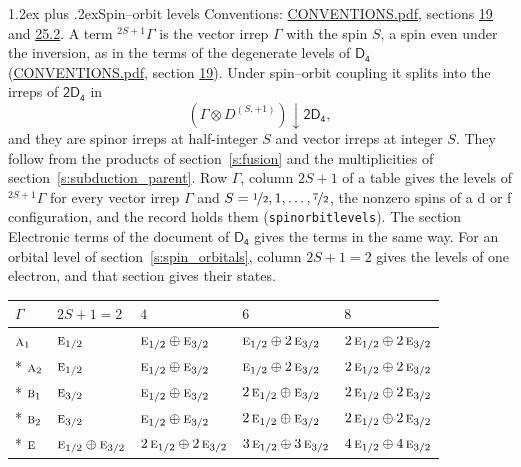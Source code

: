 \documentclass[10pt,a4paper]{article}
\makeatletter
\renewcommand\section{\@startsection{section}{1}{\z@}{-3ex plus -1ex minus -.2ex}%
  {1.2ex plus .2ex}{\normalfont\large\sffamily\bfseries\color{parttitle}}}
\numberwithin{equation}{section}
\newcommand{\grp}[1]{\mathsf{#1}}
\newcommand{\irr}[1]{\text{\normalfont\scshape #1}}
\newcommand{\restr}[2]{#1\!\downarrow#2}
\newcommand{\irrJp}[2]{D^{(#1,#2)}}
\newcommand{\irrprod}{\otimes}
\newcommand{\term}[2]{{}^{#1}#2}
\makeatother
\begin{document}
\section{Spin--orbit levels}\label{s:spin_orbit}
Conventions: \href{../../CONVENTIONS.pdf}{CONVENTIONS.pdf}, sections \href{../../../rotation/CONVENTIONS.pdf\#conv.19}{19} and \href{../../CONVENTIONS.pdf\#conv.25.2}{25.2}.
\leavevmode\label{n:local.spin}\label{n:symbol.term}A term $\term{2S+1}{\Gamma}$ is the vector irrep $\Gamma$ with the spin $S$, a spin even under the inversion, as in the terms of the degenerate levels of \href{../../../rotation/data/pdf/D4.pdf}{$\grp{D_{4}}$} (\href{../../CONVENTIONS.pdf}{CONVENTIONS.pdf}, section \href{../../../rotation/CONVENTIONS.pdf\#conv.19}{19}). Under spin--orbit coupling it splits into the irreps of $\grp{2D_{4}}$ in
\begin{equation}\label{e:spinorbit}\restr{(\Gamma \irrprod \irrJp{S}{+1})}{\grp{2D_{4}}},\end{equation}
and they are spinor irreps at half-integer $S$ and vector irreps at integer $S$. They follow from the products of section~\ref{s:fusion} and the multiplicities of section~\ref{s:subduction_parent}. Row $\Gamma$, column $2S + 1$ of a table gives the levels of $\term{2S+1}{\Gamma}$ for every vector irrep $\Gamma$ and $S = \nicefrac{1}{2}, 1, \dots, \nicefrac{7}{2}$, the nonzero spins of a d or f configuration, and the record holds them (\texttt{spinorbitlevels}). The section Electronic terms of the document of \href{../../../rotation/data/pdf/D4.pdf}{$\grp{D_{4}}$} gives the terms in the same way. For an orbital level of section~\ref{s:spin_orbitals}, column $2S + 1 = 2$ gives the levels of one electron, and that section gives their states.
{\small\setlength{\tabcolsep}{3pt}\begin{longtable}{@{}lllll@{}}\toprule
$\Gamma$ & $2S + 1 = 2$ & $4$ & $6$ & $8$\\\midrule\endhead
\bottomrule\endfoot\endlastfoot
$\irr{a}_{1}$ & $\irr{e}_{1/2}$ & $\irr{e}_{1/2}\oplus \irr{e}_{3/2}$ & $\irr{e}_{1/2}\oplus 2\,\irr{e}_{3/2}$ & $2\,\irr{e}_{1/2}\oplus 2\,\irr{e}_{3/2}$\\*
$\irr{a}_{2}$ & $\irr{e}_{1/2}$ & $\irr{e}_{1/2}\oplus \irr{e}_{3/2}$ & $\irr{e}_{1/2}\oplus 2\,\irr{e}_{3/2}$ & $2\,\irr{e}_{1/2}\oplus 2\,\irr{e}_{3/2}$\\*
$\irr{b}_{1}$ & $\irr{e}_{3/2}$ & $\irr{e}_{1/2}\oplus \irr{e}_{3/2}$ & $2\,\irr{e}_{1/2}\oplus \irr{e}_{3/2}$ & $2\,\irr{e}_{1/2}\oplus 2\,\irr{e}_{3/2}$\\*
$\irr{b}_{2}$ & $\irr{e}_{3/2}$ & $\irr{e}_{1/2}\oplus \irr{e}_{3/2}$ & $2\,\irr{e}_{1/2}\oplus \irr{e}_{3/2}$ & $2\,\irr{e}_{1/2}\oplus 2\,\irr{e}_{3/2}$\\*
$\irr{e}$ & $\irr{e}_{1/2}\oplus \irr{e}_{3/2}$ & $2\,\irr{e}_{1/2}\oplus 2\,\irr{e}_{3/2}$ & $3\,\irr{e}_{1/2}\oplus 3\,\irr{e}_{3/2}$ & $4\,\irr{e}_{1/2}\oplus 4\,\irr{e}_{3/2}$\\
\bottomrule\end{longtable}}
\end{document}
